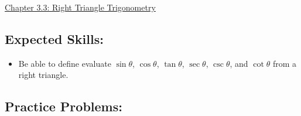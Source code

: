 \documentclass[12pt]{article}
\begin{document}
\begin{center}
\underline{\LARGE{Chapter 3.3: Right Triangle Trigonometry}}
\end{center}

\subsection*{Expected Skills:}

\begin{itemize}

\item Be able to define evaluate $\sin{\theta}$, $\cos{\theta}$, $\tan{\theta}$, $\sec{\theta}$, $\csc{\theta}$, and $\cot{\theta}$ from a right triangle.

\end{itemize}

\subsection*{Practice Problems: }
\end{document}
